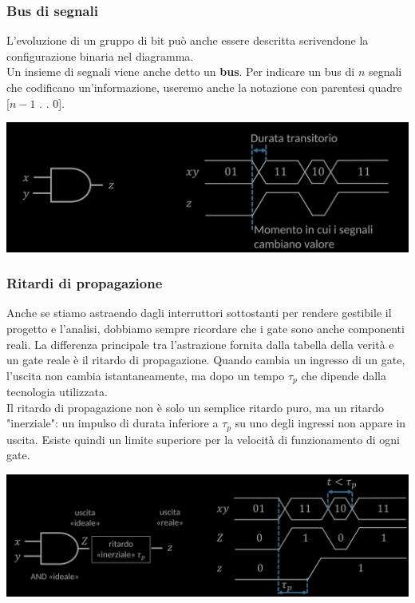 \documentclass{article}
\begin{document}
\subsubsection{Bus di segnali}
L’evoluzione di un gruppo di bit può anche essere descritta scrivendone la configurazione binaria nel diagramma.\\
Un insieme di segnali viene anche detto un \textbf{bus}. Per indicare un bus di $n$ segnali che codificano un’informazione, useremo anche la notazione con parentesi quadre [$n-1$ . . 0].
\begin{center}
    \includegraphics[scale=0.35]{diagrammabus.png}
\end{center}
\subsubsection{Ritardi di propagazione}
Anche se stiamo astraendo dagli interruttori sottostanti per rendere gestibile il progetto e l’analisi, dobbiamo sempre ricordare che i gate sono anche componenti reali. La differenza principale tra l’astrazione fornita dalla tabella della verità e un gate reale è il ritardo di propagazione. Quando cambia un ingresso di un gate, l’uscita non cambia istantaneamente, ma dopo un tempo $\tau_p$ che dipende dalla tecnologia utilizzata.\\
Il ritardo di propagazione non è solo un semplice ritardo puro, ma un ritardo "inerziale": un impulso di durata inferiore a $\tau_p$ su uno degli ingressi non appare in uscita. Esiste quindi un limite superiore per la velocità di funzionamento di ogni gate.
\begin{center}
    \includegraphics[scale=0.35]{ritardi.png}
\end{center}
\end{document}
